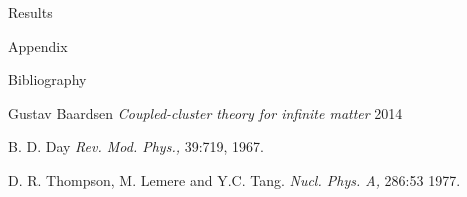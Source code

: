 \documentclass[twoside,english]{uiofysmaster}
\begin{document}
\begin{chapter}{Results}
	
\end{chapter}




\begin{chapter}{Appendix}
	
\end{chapter}

\medskip

\begin{chapter}{Bibliography}
	\begin{thebibliography}{9}
		Gustav Baardsen
		\textit{Coupled-cluster theory for infinite matter} 2014

		B. D. Day
		\textit{Rev. Mod. Phys.,}
		39:719, 1967.

		D. R. Thompson, M. Lemere and Y.C. Tang.
		\textit{Nucl. Phys. A,} 286:53 1977.

	\end{thebibliography}
\end{chapter}
\end{document}
